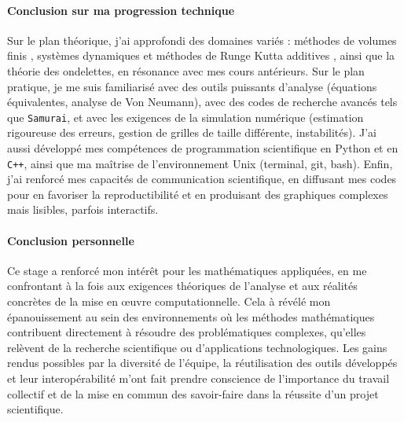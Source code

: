 \paragraph*{Conclusion sur ma progression technique}\label{par:cc2}
Sur le plan théorique, j'ai approfondi des domaines variés : méthodes de volumes finis \cite{LeVeque1990}, systèmes dynamiques et méthodes de Runge Kutta additives \cite{HairerAndWanner1}, ainsi que la théorie des ondelettes, en résonance avec mes cours antérieurs.
Sur le plan pratique, je me suis familiarisé avec des outils puissants d'analyse (équations équivalentes, analyse de Von Neumann), avec des codes de recherche avancés tels que \texttt{Samurai}, et avec les exigences de la simulation numérique (estimation rigoureuse des erreurs, gestion de grilles de taille différente, instabilités).
J'ai aussi développé mes compétences de programmation scientifique en Python et en \texttt{C++}, ainsi que ma maîtrise de l'environnement Unix (terminal, git, bash).
Enfin, j'ai renforcé mes capacités de communication scientifique, en diffusant mes codes pour en favoriser la reproductibilité et en produisant des graphiques complexes mais lisibles, parfois interactifs.
\paragraph*{Conclusion personnelle}\label{par:cc3}
Ce stage a renforcé mon intérêt pour les mathématiques appliquées, 
en me confrontant à la fois aux exigences théoriques de l'analyse et aux réalités concrètes de la mise en œuvre computationnelle.
Cela à révélé mon épanouissement au sein des environnements où les méthodes mathématiques contribuent directement à résoudre des problématiques complexes, 
qu'elles relèvent de la recherche scientifique ou d'applications technologiques.
Les gains rendus possibles par la diversité de l'équipe, 
la réutilisation des outils développés et leur interopérabilité m'ont fait prendre conscience
de l'importance du travail collectif et de la mise en commun des savoir-faire dans la réussite d'un projet scientifique.